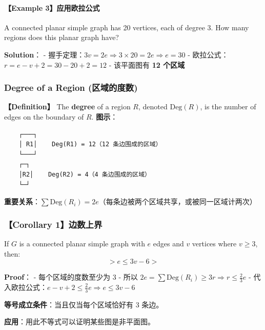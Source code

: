 \documentclass[10pt,a4paper,openany]{ctexbook}
\theoremstyle{definition}
\theoremstyle{remark}
\renewenvironment{quote}
  {\list{}{\leftmargin=1em\rightmargin=0pt\topsep=0.5pt\partopsep=0pt}\item[]}
  {\endlist}
\begin{document}
\paragraph{【Example 3】应用欧拉公式}

\begin{quote}
A connected planar simple graph has 20 vertices, each of degree 3. How many regions does this planar graph have?

\textbf{Solution}：
- 握手定理：$3v = 2e \Rightarrow 3 \times 20 = 2e \Rightarrow e = 30$
- 欧拉公式：$r = e - v + 2 = 30 - 20 + 2 = 12$
- 该平面图有 \textbf{12 个区域}

\end{quote}
\vspace{-2pt}

\subsubsection{Degree of a Region (区域的度数)}

\textbf{【Definition】} The \textbf{degree} of a region $R$, denoted $\text{Deg}(R)$, is the number of edges on the boundary of $R$.
\textbf{图示}：
{\footnotesize\begin{verbatim}
    ┌───┐
    │ R1│    Deg(R1) = 12（12 条边围成的区域）
    └───┘
    ┌─┐
    │R2│    Deg(R2) = 4（4 条边围成的区域）
    └─┘
\end{verbatim}}

\textbf{重要关系}：$\sum \text{Deg}(R_i) = 2e$（每条边被两个区域共享，或被同一区域计两次）
\vspace{-2pt}

\subsubsection{【Corollary 1】边数上界}

\begin{quote}
If $G$ is a connected planar simple graph with $e$ edges and $v$ vertices where $v \ge 3$, then:
\[
> e \le 3v - 6
> 
\]


\textbf{Proof}：
- 每个区域的度数至少为 3
- 所以 $2e = \sum \text{Deg}(R_i) \ge 3r \Rightarrow r \le \frac{2}{3}e$
- 代入欧拉公式：$e - v + 2 \le \frac{2}{3}e \Rightarrow e \le 3v - 6$

\textbf{等号成立条件}：当且仅当每个区域恰好有 3 条边。

\textbf{应用}：用此不等式可以证明某些图是非平面图。

\end{quote}
\end{document}
